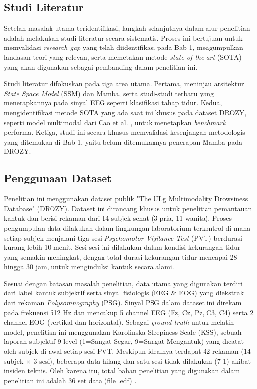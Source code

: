 \subsection{Studi Literatur} \label{III.Langkah 2}
Setelah masalah utama teridentifikasi, langkah selanjutnya dalam alur penelitian adalah melakukan studi literatur secara sistematis. Proses ini bertujuan untuk memvalidasi \textit{research gap} yang telah diidentifikasi pada Bab 1, mengumpulkan landasan teori yang relevan, serta memetakan metode \textit{state-of-the-art} (SOTA) yang akan digunakan sebagai pembanding dalam penelitian ini. \par

Studi literatur difokuskan pada tiga area utama. Pertama, meninjau arsitektur \textit{State Space Model} (SSM) dan Mamba, serta studi-studi terbaru yang menerapkannya pada sinyal EEG seperti klasifikasi tahap tidur. Kedua, mengidentifikasi metode SOTA yang ada saat ini khusus pada dataset DROZY, seperti model multimodal dari Cao et al. \cite{Cao2025Optimized}, untuk menetapkan \textit{benchmark} performa. Ketiga, studi ini secara khusus memvalidasi kesenjangan metodologis yang ditemukan di Bab 1, yaitu belum ditemukannya penerapan Mamba pada DROZY. \par

\subsection{Penggunaan Dataset} \label{III.Langkah3}
Penelitian ini menggunakan dataset publik "The ULg Multimodality Drowsiness Database" (DROZY). Dataset ini dirancang khusus untuk penelitian pemantauan kantuk dan berisi rekaman dari 14 subjek sehat (3 pria, 11 wanita). Proses pengumpulan data dilakukan dalam lingkungan laboratorium terkontrol di mana setiap subjek menjalani tiga sesi \textit{Psychomotor Vigilance Test} (PVT) berdurasi kurang lebih 10 menit. Sesi-sesi ini dilakukan dalam kondisi kekurangan tidur yang semakin meningkat, dengan total durasi kekurangan tidur mencapai 28 hingga 30 jam, untuk menginduksi kantuk secara alami. 

Sesuai dengan batasan masalah penelitian, data utama yang digunakan terdiri dari label kantuk subjektif serta sinyal fisiologis (EEG \& EOG) yang diekstrak dari rekaman \textit{Polysomnography} (PSG). Sinyal PSG dalam dataset ini direkam pada frekuensi 512 Hz dan mencakup 5 channel EEG (Fz, Cz, Pz, C3, C4) serta 2 channel EOG (vertikal dan horizontal). Sebagai \textit{ground truth} untuk melatih model, penelitian ini menggunakan Karolinska Sleepiness Scale (KSS), sebuah laporan subjektif 9-level (1=Sangat Segar, 9=Sangat Mengantuk) yang dicatat oleh subjek di awal setiap sesi PVT. Meskipun idealnya terdapat 42 rekaman (14 subjek $\times$ 3 sesi), beberapa data hilang dan satu sesi tidak dilakukan (7-1) akibat insiden teknis. Oleh karena itu, total bahan penelitian yang digunakan dalam penelitian ini adalah 36 set data (file .edf) \cite{Massoz2016}.


